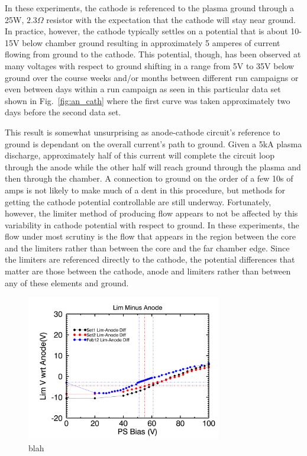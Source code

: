 \documentclass[aip,pop,amsmath,amssymb,preprint,superscriptaddress]{revtex4-1} %
\begin{document}
In these experiments, the cathode is referenced to the plasma ground through a 25W, $2.3\Omega$ resistor with the expectation that the cathode will stay near ground. In practice, however, the cathode typically settles on a potential that is about 10-15V below chamber ground resulting in approximately 5 amperes of current flowing from ground to the cathode. This potential, though, has been observed at many voltages with respect to ground shifting in a range from 5V to 35V below ground over the course weeks and/or months between different run campaigns or even between days within a run campaign as seen in this particular data set shown in Fig.~\ref{fig:an_cath} where the first curve was taken approximately two days before the second data set.

This result is somewhat unsurprising as anode-cathode circuit's reference to ground is dependant on the overall current's path to ground. Given a 5kA plasma discharge, approximately half of this current will complete the circuit loop through the anode while the other half will reach ground through the plasma and then through the chamber. A connection to ground on the order of a few 10s of amps is not likely to make much of a dent in this procedure, but methods for getting the cathode potential controllable are still underway. Fortunately, however, the limiter method of producing flow appears to not be affected by this variability in cathode potential with respect to ground. In these experiments, the flow under most scrutiny is the flow that appears in the region between the core and the limiters rather than between the core and the far chamber edge. Since the limiters are referenced directly to the cathode, the potential differences that matter are those between the cathode, anode and limiters rather than between any of these elements and ground.

\begin{figure}[!htbp]
\centerline{
\includegraphics[width=8.5cm]{LimAn_vs_PS}}
\caption{\label{fig:LimAn_vs_PS} blah}
\end{figure}
\end{document}

